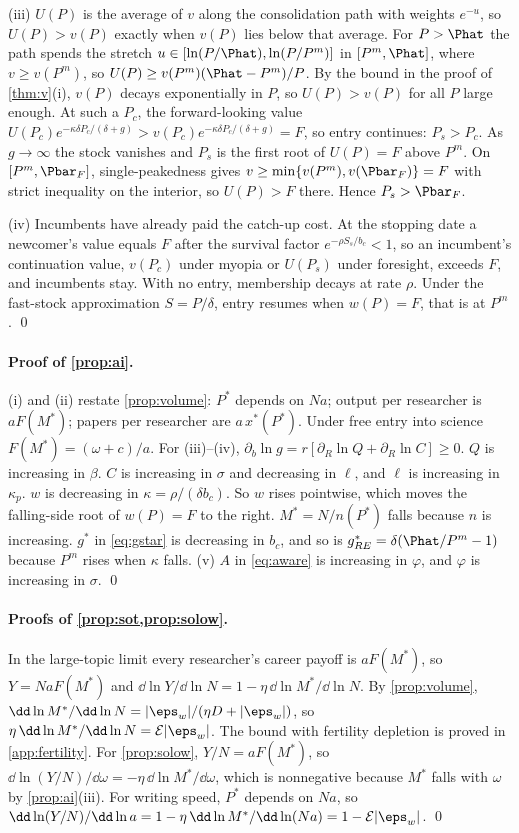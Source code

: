 (iii) $U(P)$ is the average of $v$ along the consolidation path with weights $e^{-u}$, so $U(P)>v(P)$ exactly when $v(P)$ lies below that average. For $P>\Phat$ the path spends the stretch $u\in[\ln(P/\Phat),\ln(P/P^m)]$ in $[P^m,\Phat]$, where $v\ge v(P^m)$, so $U(P)\ge v(P^m)(\Phat-P^m)/P$. By the bound in the proof of \cref{thm:v}(i), $v(P)$ decays exponentially in $P$, so $U(P)>v(P)$ for all $P$ large enough. At such a $P_c$, the forward-looking value $U(P_c)e^{-\kappa\delta P_c/(\delta+g)}>v(P_c)e^{-\kappa\delta P_c/(\delta+g)}=F$, so entry continues: $P_s>P_c$. As $g\to\infty$ the stock vanishes and $P_s$ is the first root of $U(P)=F$ above $P^m$. On $[P^m,\Pbar_F]$, single-peakedness gives $v\ge\min\{v(P^m),v(\Pbar_F)\}=F$ with strict inequality on the interior, so $U(P)>F$ there. Hence $P_s>\Pbar_F$.

(iv) Incumbents have already paid the catch-up cost. At the stopping date a newcomer's value equals $F$ after the survival factor $e^{-\rho S_s/b_c}<1$, so an incumbent's continuation value, $v(P_c)$ under myopia or $U(P_s)$ under foresight, exceeds $F$, and incumbents stay. With no entry, membership decays at rate $\rho$. Under the fast-stock approximation $S=P/\delta$, entry resumes when $w(P)=F$, that is at $P^m$. \qed

\paragraph{Proof of \cref{prop:ai}.} (i) and (ii) restate \cref{prop:volume}: $P^*$ depends on $Na$; output per researcher is $aF(M^*)$; papers per researcher are $a\,x^*(P^*)$. Under free entry into science $F(M^*)=(\omega+c)/a$. For (iii)--(iv), $\partial_b\ln g=r[\partial_R\ln Q+\partial_R\ln C]\ge0$. $Q$ is increasing in $\beta$. $C$ is increasing in $\sigma$ and decreasing in $\ell$, and $\ell$ is increasing in $\kappa_p$. $w$ is decreasing in $\kappa=\rho/(\delta b_c)$. So $w$ rises pointwise, which moves the falling-side root of $w(P)=F$ to the right. $M^*=N/n(P^*)$ falls because $n$ is increasing. $g^*$ in \eqref{eq:gstar} is decreasing in $b_c$, and so is $g^*_{RE}=\delta(\Phat/P^m-1)$ because $P^m$ rises when $\kappa$ falls. (v) $A$ in \eqref{eq:aware} is increasing in $\varphi$, and $\varphi$ is increasing in $\sigma$. \qed

\paragraph{Proofs of \cref{prop:sot,prop:solow}.} In the large-topic limit every researcher's career payoff is $aF(M^*)$, so $Y=NaF(M^*)$ and $\dd\ln Y/\dd\ln N=1-\eta\,\dd\ln M^*/\dd\ln N$. By \cref{prop:volume}, $\dd\ln M^*/\dd\ln N=|\eps_w|/(\eta D+|\eps_w|)$, so $\eta\,\dd\ln M^*/\dd\ln N=\mathcal E|\eps_w|$. The bound with fertility depletion is proved in \cref{app:fertility}. For \cref{prop:solow}, $Y/N=aF(M^*)$, so $\dd\ln(Y/N)/\dd\omega=-\eta\,\dd\ln M^*/\dd\omega$, which is nonnegative because $M^*$ falls with $\omega$ by \cref{prop:ai}(iii). For writing speed, $P^*$ depends on $Na$, so $\dd\ln(Y/N)/\dd\ln a=1-\eta\,\dd\ln M^*/\dd\ln(Na)=1-\mathcal E|\eps_w|$. \qed
